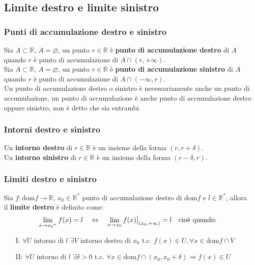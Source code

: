 \documentclass[a4paper]{article}
\newcommand\restr[2]{{%
	\left.\kern-\nulldelimiterspace %
	#1 %
	\vphantom{\big|} %
	\right|_{#2} %
	}}
\newcommand\dom{\text{dom}}
\begin{document}
\subsection{Limite destro e limite sinistro}
\subsubsection*{Punti di accumulazione destro e sinistro}
Sia \(A \subset \mathbb{R}\), \(A = \varnothing\), un punto \(r \in \mathbb{R}\) è \textbf{punto di accumulazione destro} di \(A\) quando \(r\) è punto di accumulazione di \(A \cap \left( r, + \infty \right)\). \\
Sia \(A \subset \mathbb{R}\), \(A = \varnothing\), un punto \(r \in \mathbb{R}\) è \textbf{punto di accumulazione sinistro} di \(A\) quando \(r\) è punto di accumulazione di \(A \cap \left( - \infty, r \right)\). \\
Un punto di accumulazione destro o sinistro è necessariamente anche un punto di accumulazione,
un punto di accumulazione è anche punto di accumulazione destro oppure sinistro, non è detto che sia entrambi.

\subsubsection*{Intorni destro e sinistro}
Un \textbf{intorno destro} di \(r \in \mathbb{R}\) è un insieme della forma \(\left( r, r + \delta \right)\). \\
Un \textbf{intorno sinistro} di \(r \in \mathbb{R}\) è un insieme della forma \(\left( r - \delta, r \right)\).

\subsubsection*{Limiti destro e sinistro}
Sia \(f: \dom f \to \mathbb{R}\), \(x_0 \in \mathbb{R}^*\) punto di accumulazione destro di \(\dom f\) e \(l \in \mathbb{R}^*\), allora il \textbf{limite destro} è definito come:
\[\lim_{x \to {x_0}^+} f(x) = l \quad \Leftrightarrow \quad \lim_{x \to {x_0}} \restr{f(x)}{\left( x_0, + \infty \right)} = l \quad \text{cioè quando:}\]
\begin{itemize}
	\item[I:] \(\forall U\) intorno di \(l\) \(\exists V\) intorno destro di \(x_0\) t.c. \(f(x) \in U, \forall x \in \dom f \cap V\)
	\item[II:] \(\forall U\) intorno di \(l\) \(\exists \delta > 0\) t.c. \(\forall x \in \dom f \cap \left( x_0, x_0 + \delta \right) \Rightarrow f(x) \in U\)
\end{itemize}
\end{document}
